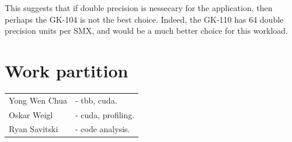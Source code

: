 \documentclass[11pt, oneside, a4paper]{article}
\begin{document}
This suggests that if double precision is nessecary for the application, then perhaps the GK-104 is not the best choice. Indeed, the GK-110 has 64 double precision units per SMX, and would be a much better choice for this workload.




\section{Work partition} %
\label{sec:work_partition}
\begin{tabular}{ l l  }
Yong Wen Chua & - tbb, cuda. \\
Oskar Weigl & - cuda, profiling. \\
Ryan Savitski & - code analysis. \\
\end{tabular}
\end{document}
